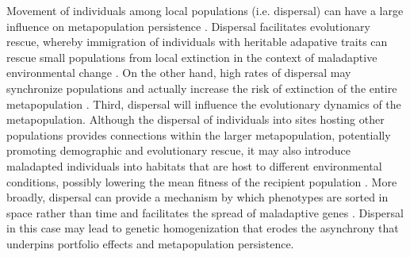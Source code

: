 \documentclass{revtex4}
\begin{document}
Movement of individuals among local populations (i.e. dispersal) can have a large influence on metapopulation persistence \citep{MilnerGulland:2011vm}. 
Dispersal facilitates evolutionary rescue, whereby immigration of individuals with heritable adapative traits can rescue small populations from local extinction in the context of maladaptive environmental change \citep{Bell:2011ki,Carlson:2014is}.
On the other hand, high rates of dispersal may synchronize populations and actually increase the risk of extinction of the entire metapopulation \citep{Earn:2000fm}. 
Third, dispersal will influence the evolutionary dynamics of the metapopulation.
Although the dispersal of individuals into sites hosting other populations provides connections within the larger metapopulation, potentially promoting demographic and evolutionary rescue, it may also introduce maladapted individuals into habitats that are host to different environmental conditions, possibly lowering the mean fitness of the recipient population \citep{Muhlfeld:2014hs}. 
More broadly, dispersal can provide a mechanism by which phenotypes are sorted in space rather than time and facilitates the spread of maladaptive genes \citep{Lowe:2015ft}.
Dispersal in this case may lead to genetic homogenization that erodes the asynchrony that underpins portfolio effects and metapopulation persistence. 
\end{document}
